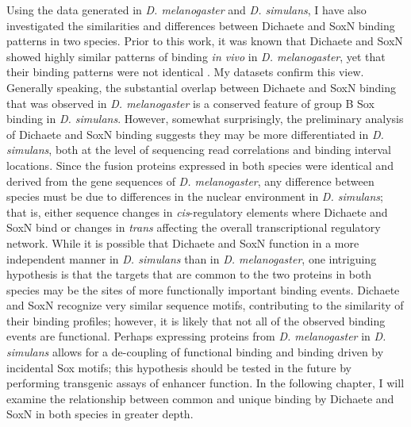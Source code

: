 Using the data generated in \emph{D. melanogaster} and \emph{D. simulans}, I have also investigated the similarities and differences between Dichaete and SoxN binding patterns in two species. Prior to this work, it was known that Dichaete and SoxN showed highly similar patterns of binding \emph{in vivo} in \emph{D. melanogaster}, yet that their binding patterns were not identical \citep{ferrero_soxneuro_2014}. My datasets confirm this view. Generally speaking, the substantial overlap between Dichaete and SoxN binding that was observed in \emph{D. melanogaster} is a conserved feature of group B Sox binding in \emph{D. simulans}. However, somewhat surprisingly, the preliminary analysis of Dichaete and SoxN binding suggests they may be more differentiated in \emph{D. simulans}, both at the level of sequencing read correlations and binding interval locations. Since the fusion proteins expressed in both species were identical and derived from the gene sequences of \emph{D. melanogaster}, any difference between species must be due to differences in the nuclear environment in \emph{D. simulans}; that is, either sequence changes in \emph{cis}-regulatory elements where Dichaete and SoxN bind or changes in \emph{trans} affecting the overall transcriptional regulatory network. While it is possible that Dichaete and SoxN function in a more independent manner in \emph{D. simulans} than in \emph{D. melanogaster}, one intriguing hypothesis is that the targets that are common to the two proteins in both species may be the sites of more functionally important binding events. Dichaete and SoxN recognize very similar sequence motifs, contributing to the similarity of their binding profiles; however, it is likely that not all of the observed binding events are functional. Perhaps expressing proteins from \emph{D. melanogaster} in \emph{D. simulans} allows for a de-coupling of functional binding and binding driven by incidental Sox motifs; this hypothesis should be tested in the future by performing transgenic assays of enhancer function. In the following chapter, I will examine the relationship between common and unique binding by Dichaete and SoxN in both species in greater depth.

